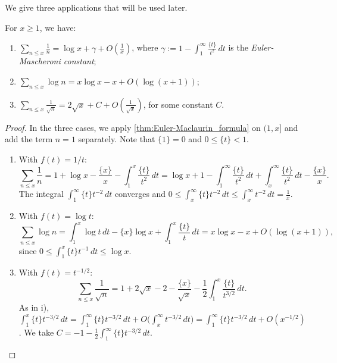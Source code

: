 We give three applications that will be used later.
\begin{proposition}\label{prop:classical_sums}
    For $x \ge 1$, we have:
    \begin{enumerate}[label={\upshape\roman*)}]
        \item\label{prop:classical_sums:harmonic} $\displaystyle\sum_{n\le x}\frac 1n = \log x + \gamma + O\left(\frac 1x\right)$, where $\displaystyle\gamma := 1-\int_1^\infty \frac{\{t\}}{t^2}\,dt$ is the \emph{Euler-Mascheroni constant};
        \item\label{prop:classical_sums:log} $\displaystyle\sum_{n\le x}\log n = x\log x - x + O(\log (x+1))$;
        \item\label{prop:classical_sums:sqrt} $\displaystyle\sum_{n\le x}\frac{1}{\sqrt n} = 2\sqrt x + C + O\left(\frac{1}{\sqrt x}\right)$, for some constant $C$.
    \end{enumerate}
\end{proposition}
\begin{proof}
    In the three cases, we apply \cref{thm:Euler-Maclaurin_formula} on $(1,x]$ and add the term $n=1$ separately. Note that $\{1\}=0$ and $0 \le \{t\} <1$.
    \begin{enumerate}[label={\upshape\roman*)}]
        \item With $f(t) = 1/t$:
            \begin{equation*}
                \sum_{n\le x}\frac 1n = 1 + \log x - \frac{\{x\}}{x} - \int_1^x\frac{\{t\}}{t^2}\,dt = \log x + 1 - \int_1^\infty\frac{\{t\}}{t^2}\,dt + \int_x^\infty\frac{\{t\}}{t^2}\,dt - \frac{\{x\}}{x}.
            \end{equation*}
            The integral $\int_1^\infty \{t\}t^{-2}\,dt$ converges and $0\le \int_x^\infty\{t\}t^{-2}\,dt \le \int_x^\infty t^{-2}\,dt = \frac 1x$.
        \item With $f(t) = \log t$:
            \begin{equation*}
                \sum_{n\le x}\log n = \int_1^x \log t\,dt - \{x\}\log x + \int_1^x \frac{\{t\}}{t}\,dt = x\log x - x + O(\log (x+1)),
            \end{equation*}
            since $0\le\int_1^x \{t\}t^{-1}\,dt \le \log x$.
        \item With $f(t) = t^{-1/2}$:
            \begin{equation*}
                \sum_{n\le x}\frac{1}{\sqrt n} = 1 + 2\sqrt x - 2 - \frac{\{x\}}{\sqrt x} - \frac12\int_1^x\frac{\{t\}}{t^{3/2}}\,dt .
            \end{equation*}
            As in i), $\int_1^x \{t\}t^{-3/2}\,dt = \int_1^\infty \{t\}t^{-3/2}\,dt + O\big(\int_x^\infty t^{-3/2}\,dt\big) = \int_1^\infty \{t\}t^{-3/2}\,dt + O(x^{-1/2})$. We take $C = -1-\frac12\int_1^\infty \{t\}t^{-3/2}\,dt$.
    \end{enumerate}
\end{proof}

